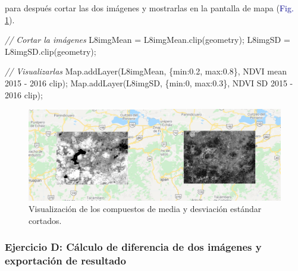 \documentclass[
  12pt,
  letterpaper,
  twoside]{book}
\newenvironment{Shaded}{\begin{snugshade}}{\end{snugshade}}
\newcommand{\BuiltInTok}[1]{#1}
\newcommand{\CommentTok}[1]{\textcolor[rgb]{0.24,0.58,0.00}{\textit{#1}}}
\newcommand{\DataTypeTok}[1]{\textcolor[rgb]{0.00,0.00,0.00}{#1}}
\newcommand{\DecValTok}[1]{\textcolor[rgb]{0.28,0.53,0.93}{#1}}
\newcommand{\FloatTok}[1]{\textcolor[rgb]{0.28,0.53,0.93}{#1}}
\newcommand{\FunctionTok}[1]{\textcolor[rgb]{0.48,0.12,0.64}{#1}}
\newcommand{\NormalTok}[1]{#1}
\newcommand{\OperatorTok}[1]{\textcolor[rgb]{0.00,0.00,0.00}{#1}}
\newcommand{\StringTok}[1]{\textcolor[rgb]{0.87,0.29,0.22}{#1}}
\begin{document}
para después cortar las dos imágenes y mostrarlas en la pantalla de mapa (\textcolor{darkblue}{Fig.} \ref{fig:f1022}).

\begin{Shaded}
\begin{Highlighting}[]
\CommentTok{// Cortar la imágenes}
\NormalTok{L8imgMean }\OperatorTok{=}\NormalTok{ L8imgMean}\OperatorTok{.}\FunctionTok{clip}\NormalTok{(geometry)}\OperatorTok{;}
\NormalTok{L8imgSD }\OperatorTok{=}\NormalTok{ L8imgSD}\OperatorTok{.}\FunctionTok{clip}\NormalTok{(geometry)}\OperatorTok{;}

\CommentTok{// Visualizarlas}
\BuiltInTok{Map}\OperatorTok{.}\FunctionTok{addLayer}\NormalTok{(L8imgMean}\OperatorTok{,}\NormalTok{ \{}\DataTypeTok{min}\OperatorTok{:}\FloatTok{0.2}\OperatorTok{,} \DataTypeTok{max}\OperatorTok{:}\FloatTok{0.8}\NormalTok{\}}\OperatorTok{,} \StringTok{\textquotesingle{}NDVI mean 2015 {-} 2016 clip\textquotesingle{}}\NormalTok{)}\OperatorTok{;}
\BuiltInTok{Map}\OperatorTok{.}\FunctionTok{addLayer}\NormalTok{(L8imgSD}\OperatorTok{,}\NormalTok{ \{}\DataTypeTok{min}\OperatorTok{:}\DecValTok{0}\OperatorTok{,} \DataTypeTok{max}\OperatorTok{:}\FloatTok{0.3}\NormalTok{\}}\OperatorTok{,} \StringTok{\textquotesingle{}NDVI SD 2015 {-} 2016 clip\textquotesingle{}}\NormalTok{)}\OperatorTok{;}
\end{Highlighting}
\end{Shaded}

\begin{figure}[H]

{\centering \includegraphics[width=0.95\linewidth]{Img/meansdclip} 

}

\caption{Visualización de los compuestos de media y desviación estándar cortados.}\label{fig:f1022}
\end{figure}

\hypertarget{ejercicio-d-cuxe1lculo-de-diferencia-de-dos-imuxe1genes-y-exportaciuxf3n-de-resultado}{%
\subsubsection*{Ejercicio D: Cálculo de diferencia de dos imágenes y exportación de resultado}\label{ejercicio-d-cuxe1lculo-de-diferencia-de-dos-imuxe1genes-y-exportaciuxf3n-de-resultado}}
\end{document}
